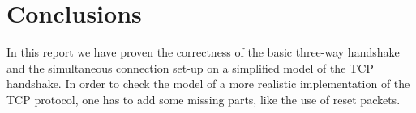 \documentclass[twocolumn]{article}
\begin{document}
\section{Conclusions}
		In this report we have proven the correctness of the basic three-way handshake and the simultaneous connection set-up on a simplified model of the TCP handshake. In order to check the model of a more realistic implementation of the TCP protocol, one has to add some missing parts, like the use of reset packets.
\end{document}
